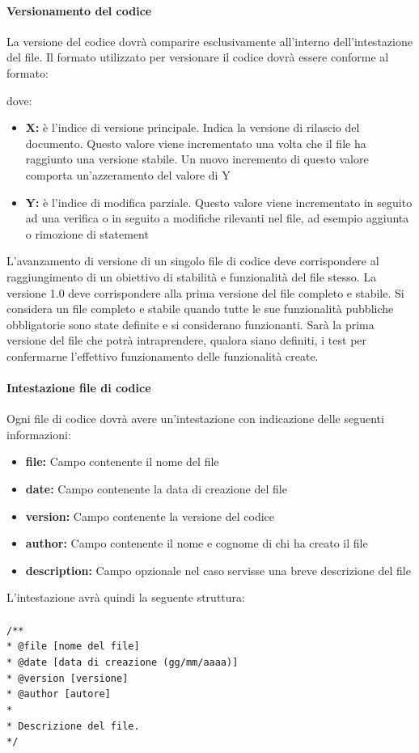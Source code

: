 \documentclass[12pt,a4paper]{article}
\begin{document}
\paragraph{Versionamento del codice}
La versione del codice dovrà comparire esclusivamente all’interno dell’intestazione del file. Il formato utilizzato per versionare il codice dovrà essere conforme al formato:
\begin{center}
\end{center}
dove:
\begin{itemize}
	\item \textbf{X:} è l’indice di versione principale. Indica la versione di rilascio del documento. Questo valore viene incrementato una volta che il file ha raggiunto una versione stabile. Un nuovo incremento di questo valore comporta un'azzeramento del valore di Y
	\item \textbf{Y:} è l’indice di modifica parziale. Questo valore viene incrementato in seguito ad una verifica o in seguito a modifiche rilevanti nel file, ad esempio aggiunta o rimozione di statement
\end{itemize}
L’avanzamento di versione di un singolo file di codice deve corrispondere al raggiungimento di un obiettivo di stabilità e funzionalità del file stesso. La versione 1.0 deve corrispondere alla prima versione del file completo e stabile. Si considera un file completo e stabile quando tutte le sue funzionalità pubbliche obbligatorie sono state definite e si considerano funzionanti. Sarà la prima versione del file che potrà intraprendere, qualora siano definiti, i test per confermarne l’effettivo funzionamento delle funzionalità create.

\paragraph{Intestazione file di codice}
Ogni file di codice dovrà avere un’intestazione con indicazione delle seguenti informazioni:
\begin{itemize}
	\item \textbf{file:} Campo contenente il nome del file
	\item \textbf{date:} Campo contenente la data di creazione del file
	\item \textbf{version:} Campo contenente la versione del codice
	\item \textbf{author:} Campo contenente il nome e cognome di chi ha creato il file
	\item \textbf{description:} Campo opzionale nel caso servisse una breve descrizione del file
\end{itemize}
L'intestazione avrà quindi la seguente struttura:\\\\
\texttt{/**\\
	* @file [nome del file]\\
	* @date [data di creazione (gg/mm/aaaa)]\\
	* @version [versione]\\
	* @author [autore]\\
	*\\
	* Descrizione del file.\\
	*/\\
}
\end{document}
